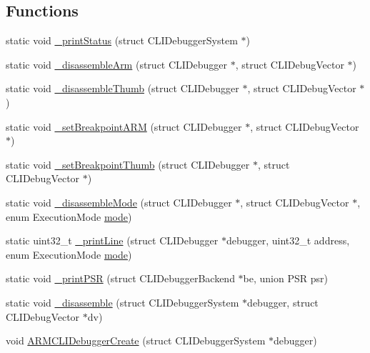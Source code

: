 \subsection*{Functions}
\begin{DoxyCompactItemize}
\item 
static void \mbox{\hyperlink{arm_2debugger_2cli-debugger_8c_a1bce4490785068fd42fca65db1fb21ad}{\+\_\+print\+Status}} (struct C\+L\+I\+Debugger\+System $\ast$)
\item 
static void \mbox{\hyperlink{arm_2debugger_2cli-debugger_8c_ab0bbaa1e92b7c34f955f91a60e2bce71}{\+\_\+disassemble\+Arm}} (struct C\+L\+I\+Debugger $\ast$, struct C\+L\+I\+Debug\+Vector $\ast$)
\item 
static void \mbox{\hyperlink{arm_2debugger_2cli-debugger_8c_ae4976961ac2fc2199fc3fd2ad59f368c}{\+\_\+disassemble\+Thumb}} (struct C\+L\+I\+Debugger $\ast$, struct C\+L\+I\+Debug\+Vector $\ast$)
\item 
static void \mbox{\hyperlink{arm_2debugger_2cli-debugger_8c_ae37b285f8c652414bf1f0aafa2d4909b}{\+\_\+set\+Breakpoint\+A\+RM}} (struct C\+L\+I\+Debugger $\ast$, struct C\+L\+I\+Debug\+Vector $\ast$)
\item 
static void \mbox{\hyperlink{arm_2debugger_2cli-debugger_8c_acad8c99d24d754d1ff65c79fdb18cf0e}{\+\_\+set\+Breakpoint\+Thumb}} (struct C\+L\+I\+Debugger $\ast$, struct C\+L\+I\+Debug\+Vector $\ast$)
\item 
static void \mbox{\hyperlink{arm_2debugger_2cli-debugger_8c_a0ff9ed2f86427256fde0a97dafb94b3c}{\+\_\+disassemble\+Mode}} (struct C\+L\+I\+Debugger $\ast$, struct C\+L\+I\+Debug\+Vector $\ast$, enum Execution\+Mode \mbox{\hyperlink{ioapi_8h_a7e43d41c2fe013a373b540cba02505cf}{mode}})
\item 
static uint32\+\_\+t \mbox{\hyperlink{arm_2debugger_2cli-debugger_8c_a1e0fedf60889558dc8c188a2ac725c88}{\+\_\+print\+Line}} (struct C\+L\+I\+Debugger $\ast$debugger, uint32\+\_\+t address, enum Execution\+Mode \mbox{\hyperlink{ioapi_8h_a7e43d41c2fe013a373b540cba02505cf}{mode}})
\item 
static void \mbox{\hyperlink{arm_2debugger_2cli-debugger_8c_abc2146e29b6db97677ad3a8321d42ffe}{\+\_\+print\+P\+SR}} (struct C\+L\+I\+Debugger\+Backend $\ast$be, union P\+SR psr)
\item 
static void \mbox{\hyperlink{arm_2debugger_2cli-debugger_8c_ab744a20db75c627a6cf552eee9339cc0}{\+\_\+disassemble}} (struct C\+L\+I\+Debugger\+System $\ast$debugger, struct C\+L\+I\+Debug\+Vector $\ast$dv)
\item 
void \mbox{\hyperlink{arm_2debugger_2cli-debugger_8c_a045f36ee0ea5e0ee4fbf4622bfb140ca}{A\+R\+M\+C\+L\+I\+Debugger\+Create}} (struct C\+L\+I\+Debugger\+System $\ast$debugger)
\end{DoxyCompactItemize}
